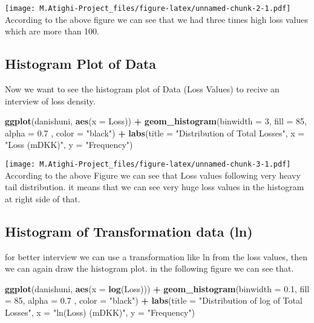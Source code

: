 \documentclass[
  12pt,
]{article}
\newenvironment{Shaded}{\begin{snugshade}}{\end{snugshade}}
\newcommand{\AttributeTok}[1]{\textcolor[rgb]{0.13,0.29,0.53}{#1}}
\newcommand{\DecValTok}[1]{\textcolor[rgb]{0.00,0.00,0.81}{#1}}
\newcommand{\FloatTok}[1]{\textcolor[rgb]{0.00,0.00,0.81}{#1}}
\newcommand{\FunctionTok}[1]{\textcolor[rgb]{0.13,0.29,0.53}{\textbf{#1}}}
\newcommand{\NormalTok}[1]{#1}
\newcommand{\SpecialCharTok}[1]{\textcolor[rgb]{0.81,0.36,0.00}{\textbf{#1}}}
\newcommand{\StringTok}[1]{\textcolor[rgb]{0.31,0.60,0.02}{#1}}
\begin{document}
\texttt{[image: M.Atighi-Project\_files/figure-latex/unnamed-chunk-2-1.pdf]}
According to the above figure we can see that we had three times high
loss values which are more than 100.

\subsection{Histogram Plot of Data}\label{histogram-plot-of-data}

Now we want to see the histogram plot of Data (Loss Values) to recive an
interview of loss density.

\begin{Shaded}
\begin{Highlighting}[]
\FunctionTok{ggplot}\NormalTok{(danishuni, }\FunctionTok{aes}\NormalTok{(}\AttributeTok{x =}\NormalTok{ Loss)) }\SpecialCharTok{+}
  \FunctionTok{geom\_histogram}\NormalTok{(}\AttributeTok{binwidth =} \DecValTok{3}\NormalTok{, }\AttributeTok{fill =} \DecValTok{85}\NormalTok{, }\AttributeTok{alpha =} \FloatTok{0.7}\NormalTok{ , }\AttributeTok{color =} \StringTok{"black"}\NormalTok{) }\SpecialCharTok{+}
  \FunctionTok{labs}\NormalTok{(}\AttributeTok{title =} \StringTok{"Distribution of Total Losses"}\NormalTok{, }\AttributeTok{x =} \StringTok{"Loss (mDKK)"}\NormalTok{, }\AttributeTok{y =} \StringTok{"Frequency"}\NormalTok{)}
\end{Highlighting}
\end{Shaded}

\texttt{[image: M.Atighi-Project\_files/figure-latex/unnamed-chunk-3-1.pdf]}
According to the above Figure we can see that Loss values following very
heavy tail distribution. it means that we can see very huge loss values
in the histogram at right side of that.

\subsection{Histogram of Transformation data
(ln)}\label{histogram-of-transformation-data-ln}

for better interview we can use a transformation like ln from the loss
values, then we can again draw the histogram plot. in the following
figure we can see that.

\begin{Shaded}
\begin{Highlighting}[]
\FunctionTok{ggplot}\NormalTok{(danishuni, }\FunctionTok{aes}\NormalTok{(}\AttributeTok{x =} \FunctionTok{log}\NormalTok{(Loss))) }\SpecialCharTok{+}
  \FunctionTok{geom\_histogram}\NormalTok{(}\AttributeTok{binwidth =} \FloatTok{0.1}\NormalTok{, }\AttributeTok{fill =} \DecValTok{85}\NormalTok{, }\AttributeTok{alpha =} \FloatTok{0.7}\NormalTok{ , }\AttributeTok{color =} \StringTok{"black"}\NormalTok{) }\SpecialCharTok{+}
  \FunctionTok{labs}\NormalTok{(}\AttributeTok{title =} \StringTok{"Distribution of log of Total Losses"}\NormalTok{, }\AttributeTok{x =} \StringTok{"ln(Loss) (mDKK)"}\NormalTok{, }\AttributeTok{y =} \StringTok{"Frequency"}\NormalTok{)}
\end{Highlighting}
\end{Shaded}
\end{document}
